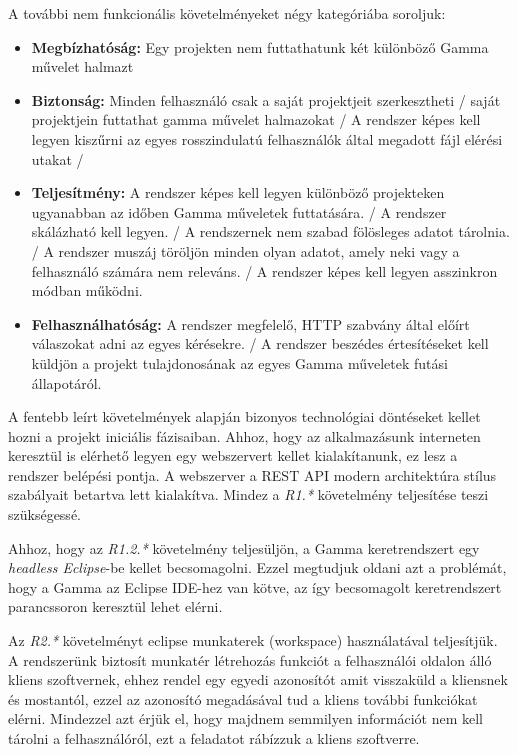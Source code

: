 A további nem funkcionális követelményeket négy kategóriába soroljuk:
\begin{itemize}
	\item \textbf{Megbízhatóság:} Egy projekten nem futtathatunk két különböző Gamma művelet halmazt
	\item \textbf{Biztonság:} Minden felhasználó csak a saját projektjeit szerkesztheti / saját projektjein futtathat gamma művelet halmazokat / A rendszer képes kell legyen kiszűrni az egyes rosszindulatú felhasználók által megadott fájl elérési utakat / 
	\item \textbf{Teljesítmény:} A rendszer képes kell legyen különböző projekteken ugyanabban az időben Gamma műveletek futtatására. / A rendszer skálázható kell legyen. / A rendszernek nem szabad fölösleges adatot tárolnia. / A rendszer muszáj töröljön minden olyan adatot, amely neki vagy a felhasználó számára nem releváns. / A rendszer képes kell legyen asszinkron módban működni.
	\item \textbf{Felhasználhatóság:} A rendszer megfelelő, HTTP szabvány által előírt válaszokat adni az egyes kérésekre. / A rendszer beszédes értesítéseket kell küldjön a projekt tulajdonosának az egyes Gamma műveletek futási állapotáról.
\end{itemize}

A fentebb leírt követelmények alapján bizonyos technológiai döntéseket kellet hozni a projekt iniciális fázisaiban. Ahhoz, hogy az alkalmazásunk interneten keresztül is elérhető legyen egy webszervert kellet kialakítanunk, ez lesz a rendszer belépési pontja. A webszerver a REST API modern architektúra stílus szabályait betartva lett kialakítva. Mindez a \textit{R1.*} követelmény teljesítése teszi szükségessé. 

Ahhoz, hogy az \textit{R1.2.*} követelmény teljesüljön, a Gamma keretrendszert egy \textit{headless Eclipse}-be kellet becsomagolni. Ezzel megtudjuk oldani azt a problémát, hogy a Gamma az Eclipse IDE-hez van kötve, az így becsomagolt keretrendszert parancssoron keresztül lehet elérni.

Az \textit{R2.*} követelményt eclipse munkaterek (workspace) használatával teljesítjük. A rendszerünk biztosít munkatér létrehozás funkciót a felhasználói oldalon álló kliens szoftvernek, ehhez rendel egy egyedi azonosítót amit visszaküld a kliensnek és mostantól, ezzel az azonosító megadásával tud a kliens további funkciókat elérni. Mindezzel azt érjük el, hogy majdnem semmilyen információt nem kell tárolni a felhasználóról, ezt a feladatot rábízzuk a kliens szoftverre.

